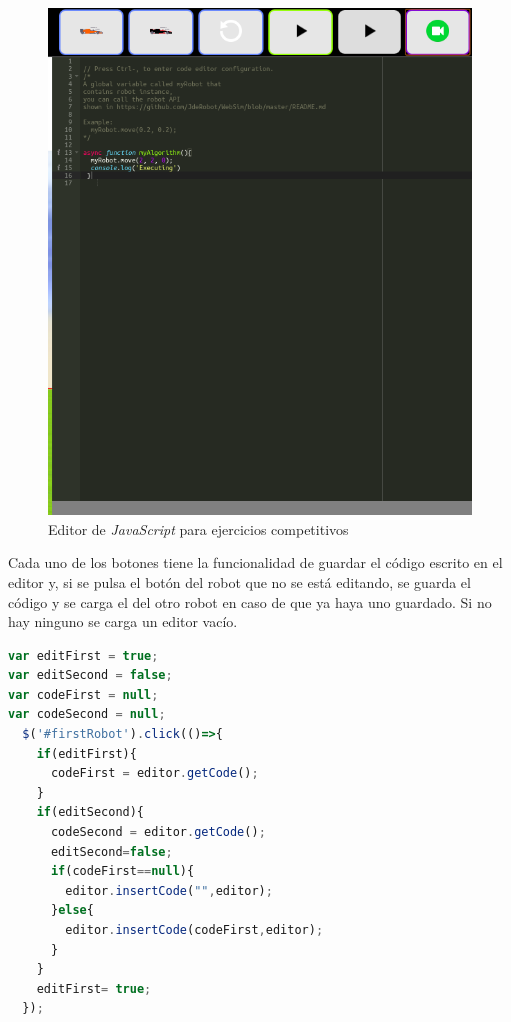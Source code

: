     \begin{figure}[H]
        \centering            
        \includegraphics[scale=0.30]{img/competitiveEditorJavascript.png}
        \caption{Editor de \textit{JavaScript} para ejercicios competitivos}
        \label{fig:javascript_competitivo}
    \end{figure}
    
Cada uno de los botones tiene la funcionalidad de guardar el código escrito en el editor y, si se pulsa el botón del robot que no se está editando, se guarda el código y se carga el del otro robot en caso de que ya haya uno guardado. Si no hay ninguno se carga un editor vacío. 

\begin{lstlisting}[language=javascript]
var editFirst = true;
var editSecond = false;
var codeFirst = null;
var codeSecond = null;
  $('#firstRobot').click(()=>{
    if(editFirst){
      codeFirst = editor.getCode();
    }
    if(editSecond){
      codeSecond = editor.getCode();
      editSecond=false;
      if(codeFirst==null){
        editor.insertCode("",editor);
      }else{
        editor.insertCode(codeFirst,editor);
      }
    }
    editFirst= true;
  });
\end{lstlisting}

